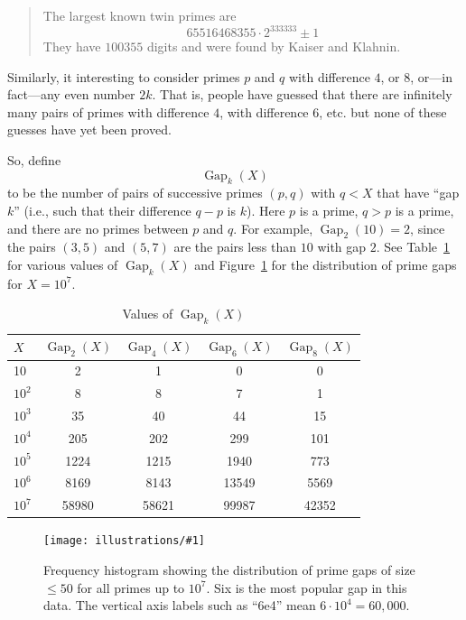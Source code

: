 \documentclass[openany]{book}
\DeclareMathOperator{\Gap}{Gap}
\newcommand{\ill}[3]{%
   \begin{figure}[H]%
   \vspace{-2ex}
   \centering%
   \texttt{[image: illustrations/\#1]}%
   \caption{#3}%
   \vspace{-2ex}
    \end{figure}}
\theoremstyle{plain}
\theoremstyle{definition}
\begin{document}
\begin{quote} The largest known twin primes are 
$$65516468355\cdot 2^{333333} \pm 1$$
They have $100355$ digits and were found by Kaiser and Klahnin. 
\end{quote}


Similarly, it interesting to consider primes $p$ and $q$
with difference $4$, or $8$, or---in fact---any even number
$2k$. That is, people have guessed that there are infinitely many
pairs of primes with difference $4$, with difference $6$, etc. but
none of these guesses have yet been proved. 




   
So, define 
$$
  \Gap_{k}(X)
$$ 
to be the number of pairs of successive primes $(p,q)$ with
$q<X$ that have ``gap $k$'' (i.e., such that their difference $q-p$ is
$k$).  Here $p$ is a prime, $q>p$ is a prime, and there are no primes
between $p$ and $q$.  For example, $\Gap_2(10) = 2$, since the pairs
$(3,5)$ and $(5,7)$ are the pairs less than $10$ with gap $2$.  See
Table~\ref{tab:gap} for various values of $\Gap_{k}(X)$ and
Figure~\ref{fig:primegapdist} for the distribution of prime gaps for
$X=10^7$.
   
   
\begin{table}[H]\centering
\caption{Values of $\Gap_{k}(X)$ \label{tab:gap}}
\vspace{1em}

\begin{tabular}{|l|c|c|c|c|}\hline
$X$ & $\Gap_{2}(X)$ & $\Gap_{4}(X)$& $\Gap_{6}(X)$ & $\Gap_{8}(X)$\\\hline
10 & 2 & 1 & 0 & 0\\\hline
$10^2$ & 8 & 8 & 7 & 1 \\\hline
$10^3$ & 35 & 40 & 44 & 15 \\\hline
$10^4$ & 205 & 202 & 299 & 101 \\\hline
$10^5$ & 1224 & 1215 & 1940 & 773 \\\hline
$10^6$ & 8169 & 8143 & 13549 & 5569 \\\hline
$10^7$ & 58980 & 58621 & 99987 & 42352 \\\hline
\end{tabular}
\end{table}  



\ill{primegapdist}{1}{Frequency histogram showing the distribution of
  prime gaps of size $\leq 50$ for all primes up to $10^7$.  Six is
  the most popular gap in this data.  The vertical axis labels 
  such as ``6e4'' mean $6\cdot 10^4=60,\!000$.
\label{fig:primegapdist}}
\end{document}
